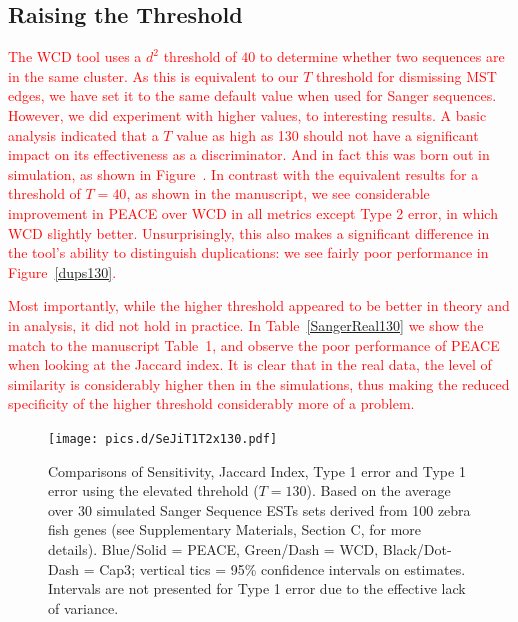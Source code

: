 \documentclass[a4paper,12pt]{article}
\newcommand{\mc}[1]{\textcolor{red}{#1}}
\newcommand{\peace} {{\small PEACE}}
\newcommand{\wcd} {{\small WCD}}
\newcommand{\capthree} {{\small Cap3}}
\begin{document}
\begin{appendix}
\subsection{Raising the Threshold}
\label{sim_thresh}
\mc{ 
  The \wcd\/ tool uses a $d^2$ threshold of $40$ to determine whether
  two sequences are in the same cluster.  As this is equivalent to our
  $T$ threshold for dismissing MST edges, we have set it to the same
  default value when used for Sanger sequences.  However, we did
  experiment with higher values, to interesting results.  A basic
  analysis indicated that a $T$ value as high as 130 should not have a
  significant impact on its effectiveness as a discriminator.  And in
  fact this was born out in simulation, as shown in
  Figure~\label{SiJiT1T2130}.  In contrast with the equivalent results
  for a threshold of $T=40$, as shown in the manuscript, we see
  considerable improvement in \peace\/ over \wcd\/ in all metrics
  except Type 2 error, in which \wcd\/ slightly
  better. Unsurprisingly, this also makes a significant difference in
  the tool's ability to distinguish duplications: we see fairly poor
  performance in Figure~\ref{dups130}.  
}

\mc{
  Most importantly, while the higher threshold appeared to be better
  in theory and in analysis, it did not hold in practice.  In
  Table~\ref{SangerReal130} we show the match to the manuscript
  Table~1, and observe the poor performance of
  \peace\/ when looking at the Jaccard index.  It is clear that in the
  real data, the level of similarity is considerably higher then in the
  simulations, thus making the reduced specificity of the higher
  threshold considerably more of a problem.
}


\begin{figure}
  \centerline{\texttt{[image: pics.d/SeJiT1T2x130.pdf]}}
  \caption{Comparisons of Sensitivity, Jaccard Index, Type 1 error and
    Type 1 error using the elevated threhold ($T=130$).  Based on the average
    over 30 simulated Sanger Sequence ESTs sets derived from 100 zebra
    fish genes (see Supplementary Materials, Section C, for more
    details).  Blue/Solid = \peace, Green/Dash = \wcd, Black/Dot-Dash
    = \capthree; vertical tics = 95\% confidence intervals on
    estimates.  Intervals are not presented for Type 1 error due to
    the effective lack of variance.}\label{SeJiT1T2130}
\end{figure}


\end{appendix}
\end{document}
